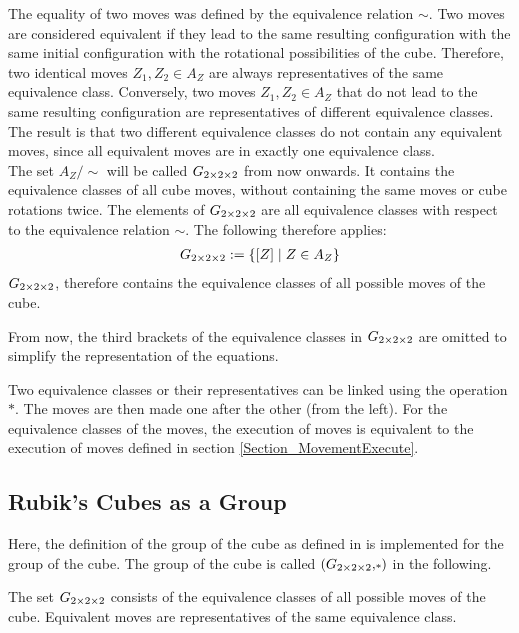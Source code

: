 The equality of two moves was defined by the equivalence relation $\sim$. Two moves are considered equivalent if they lead to the same resulting configuration with the same initial configuration with the rotational possibilities of the cube. Therefore, two identical moves $Z_1, Z_2 \in A_Z$ are always representatives of the same equivalence class. Conversely, two moves $Z_1, Z_2 \in A_Z$ that do not lead to the same resulting configuration are representatives of different equivalence classes.\\
The result is that two different equivalence classes do not contain any equivalent moves, since all equivalent moves are in exactly one equivalence class.\\
The set $A_Z / \sim$ will be called $G_{2\times 2\times 2}$ from now onwards. It contains the equivalence classes of all cube moves, without containing the same moves or cube rotations twice.
The elements of $G_{2\times 2\times 2}$ are all equivalence classes with respect to the equivalence relation $\sim$. The following therefore applies:
\begin{align*}
G_{2\times 2\times 2} := \{[Z] \mid Z \in A_Z \}
\end{align*}
$G_{2\times 2\times 2}$, therefore contains the equivalence classes of all possible moves of the cube. 

\begin{note}
From now, the third brackets of the equivalence classes in $G_{2\times 2\times 2}$ are omitted to simplify the representation of the equations.
\end{note}
Two equivalence classes or their representatives can be linked using the operation $\scriptstyle*$. The moves are then made one after the other (from the left). For the equivalence classes of the moves, the execution of moves is equivalent to the execution of moves defined in section \ref{Section_MovementExecute}.


\subsection{ \Ttwo Rubik's Cubes as a Group}
 \label{Section_CubeAsGroup}

Here, the definition of the group of the \Tthree cube as defined in \cite{JC} is implemented for the group of the \Ttwo cube. The group of the \Ttwo cube is called $\left(G_{2\times 2\times 2}, \scriptstyle*\right)$ in the following.


The set $G_{2\times 2\times 2}$ consists of the equivalence classes of all possible moves of the cube. Equivalent moves are representatives of the same equivalence class.


